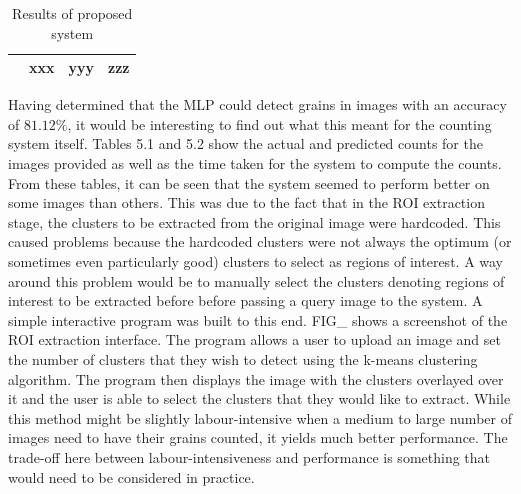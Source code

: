 \begin{table}[ht!]
\begin{tabular}{ | c | c | c | c |}
\begin{minipage}{.3\textwidth}
\begin{center}
      \end{center}
    \end{minipage}
    &
      xxx
    & 
      yyy
    & 
      zzz
    \\ \hline
  \end{tabular}
  \caption{Results of proposed system}\label{tbl:myLboro}
\end{table}
Having determined that the MLP could detect grains in images with an accuracy of $81.12\%$, it would be interesting to find out what this meant for the counting system itself. Tables 5.1 and 5.2 show the actual and predicted counts for the images provided as well as the time taken for the system to compute the counts. From these tables, it can be seen that the system seemed to perform better on some images than others. This was due to the fact that in the ROI extraction stage, the clusters to be extracted from the original image were hardcoded. This caused problems because the hardcoded clusters were not always the optimum (or sometimes even particularly good) clusters to select as regions of interest. A way around this problem would be to manually select the clusters denoting regions of interest to be extracted before before passing a query image to the system. A simple interactive program was built to this end. FIG\_ shows a screenshot of the ROI extraction interface. The program allows a user to upload an image and set the number of clusters that they wish to detect using the k-means clustering algorithm. The program then displays the image with the clusters overlayed over it and the user is able to select the clusters that they would like to extract. While this method might be slightly labour-intensive when a medium to large number of images need to have their grains counted, it yields much better performance. The trade-off here between labour-intensiveness and performance is something that would need to be considered in practice.
